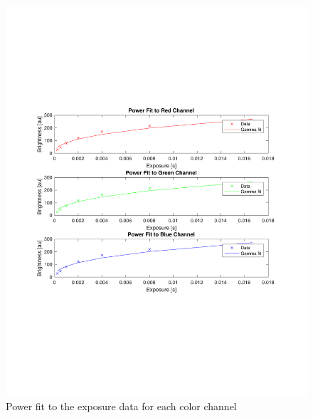 \documentclass[a4paper]{article}
\begin{document}
\begin{figure}[htb!]
    \begin{center}
        \includegraphics[width=5 in]{powerfit.pdf}
	 \end{center}
    \caption{Power fit to the exposure data for each color channel} 
    \label{fig:powerfit}
\end{figure}
\end{document}
